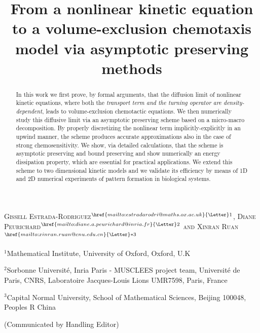 \documentclass{aims} %
\title[AP Method for Volume-Exclusion Chemotaxis]
{From a nonlinear kinetic equation to a volume-exclusion chemotaxis model via asymptotic preserving methods} %
\author[Gissell Estrada-Rodriguez,  Diane Peurichard and Xinran Ruan]{}
\theoremstyle{definition}
\begin{document}
\maketitle

\centerline{\scshape
Gissell Estrada-Rodriguez$^{{\href{mailto:estradarodri@maths.ox.ac.uk}{\textrm{\Letter}}}1}$, 
Diane Peurichard$^{{\href{mailto:diane.a.peurichard@inria.fr}{\textrm{\Letter}}}2}$
and Xinran Ruan$^{{\href{mailto:xinran.ruan@cnu.edu.cn}{\textrm{\Letter}}}*3}$}

\medskip

{\footnotesize
 \centerline{$^1$Mathematical Institute, University of Oxford, Oxford, U.K}
} %

\medskip

{\footnotesize
 \centerline{$^2$Sorbonne Universit\'e, Inria Paris - MUSCLEES project team, Universit\'e de Paris, CNRS, Laboratoire Jacques-Louis Lions UMR7598, Paris, France}
}

{\footnotesize
 \centerline{$^3$Capital Normal University, School of Mathematical Sciences, Beijing 100048, Peoples R China}
}

\bigskip

 \centerline{(Communicated by Handling Editor)}


\begin{abstract}
In this work we first prove, by formal arguments, that the diffusion limit of nonlinear kinetic equations, where both the \textit{transport term and the turning operator are density-dependent}, leads to volume-exclusion chemotactic equations. We then numerically study this diffusive limit via an asymptotic preserving scheme based on a micro-macro decomposition. By properly discretizing the nonlinear term implicitly-explicitly in an upwind manner, the scheme produces accurate approximations also in the case of strong chemosensitivity. We show, via detailed calculations, that the scheme is asymptotic preserving and {{bound preserving}} and show numerically an {energy dissipation} property, which are essential for practical applications. We extend this scheme to two dimensional kinetic models and we  validate its efficiency by means of 1D and 2D numerical experiments of pattern formation in biological systems.
\end{abstract}
\end{document}
